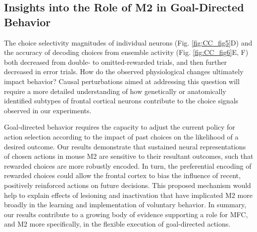 \subsection*{Insights into the Role of M2 in Goal-Directed Behavior}
The choice selectivity magnitudes of individual neurons (Fig. \ref{fig:CC_fig5}D) and the accuracy of decoding choices from ensemble activity (Fig. \ref{fig:CC_fig6}E, F) both decreased from double- to omitted-rewarded trials, and then further decreased in error trials. How do the observed physiological changes ultimately impact behavior? Causal perturbations aimed at addressing this question will require a more detailed understanding of how genetically \citep{kvitsiani2013distinct, pinto2015cell, kamigaki2017delay} or anatomically identified subtypes of frontal cortical neurons \citep{li2015motor, chen2017map, otis2017prefrontal} contribute to the choice signals observed in our experiments.

Goal-directed behavior requires the capacity to adjust the current policy for action selection according to the impact of past choices on the likelihood of a desired outcome. Our results demonstrate that sustained neural representations of chosen actions in mouse M2 are sensitive to their resultant outcomes, such that rewarded choices are more robustly encoded. In turn, the preferential encoding of rewarded choices could allow the frontal cortex to bias the influence of recent, positively reinforced actions on future decisions. This proposed mechanism would help to explain effects of lesioning \citep{passingham1988premotor, gremel2013premotor} and inactivation \citep{siniscalchi2016fast, makino2017transformation} that have implicated M2 more broadly in the learning and implementation of voluntary behavior. In summary, our results contribute to a growing body of evidence supporting a role for MFC, and M2 more specifically, in the flexible execution of goal-directed actions.